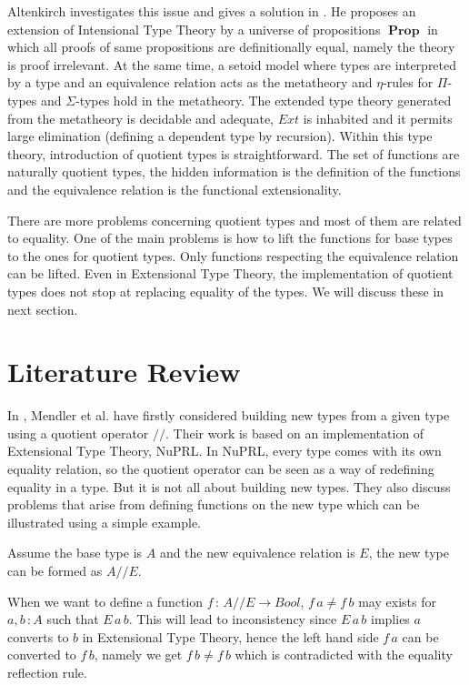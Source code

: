 \documentclass{article}
\theoremstyle{definition}
\DeclareMathOperator{\Prop}{\mathbf{Prop}}
\newcommand{\itt}{Intensional Type Theory}
\newcommand{\ett}{Extensional Type Theory}
\begin{document}
Altenkirch investigates this issue and gives a solution in
\cite{alt:99}. He proposes an extension of \itt{} by a universe of
propositions $\Prop$ in which all proofs of same propositions are
definitionally equal, namely the theory is proof irrelevant. At the same time,
a setoid model where types are interpreted by a type and an equivalence relation acts as the metatheory and $\eta$-rules for
$\Pi$-types and $\Sigma$-types hold in the metatheory. The extended type
theory generated from the metatheory is decidable and adequate, $Ext$ is
inhabited and it permits large elimination (defining a dependent type by recursion). Within this type theory,
introduction of quotient types is straightforward. 
The set of functions are naturally quotient types, the hidden information is the
definition of the functions and the equivalence relation is the
functional extensionality.

There are more problems concerning quotient types and most
of them are related to equality. One of the main problems is how to lift the functions for
base types to the ones for quotient types. Only functions respecting the
equivalence relation can be lifted. Even in \ett{}, the implementation
of quotient types does not stop at replacing equality of the types. We
will discuss these in next section.

\section{Literature Review}
\label{sec:lr}


In \cite{cab}, Mendler et al. have firstly considered building new types from a
given type using a quotient operator $//$. Their work is based on an
implementation of \ett{}, NuPRL. In NuPRL, every type
comes with its own equality relation, so the quotient operator can be
seen as a way of redefining equality in a type. But it is not all
about building new types. They also discuss problems that arise from
defining functions on the new type which can be illustrated using a simple example. 

Assume the base type is $A$ and the new equivalence relation is $E$, the new
type can be formed as $A//E$. 

When we want to define a function $f \,\colon\, A//E \to Bool$,  $f\,a \not= f\,b$ may
exists for $a, b \,\colon A$ such that $E\,a\,b$. This will lead to
inconsistency since $E\,a\,b$ implies $a$ converts to $b$ in \ett{}, hence
the left hand side $f\,a$ can be converted to $f\,b$, namely we get $f\,b \not= f\,b$
which is contradicted with the equality reflection rule. 
\end{document}
